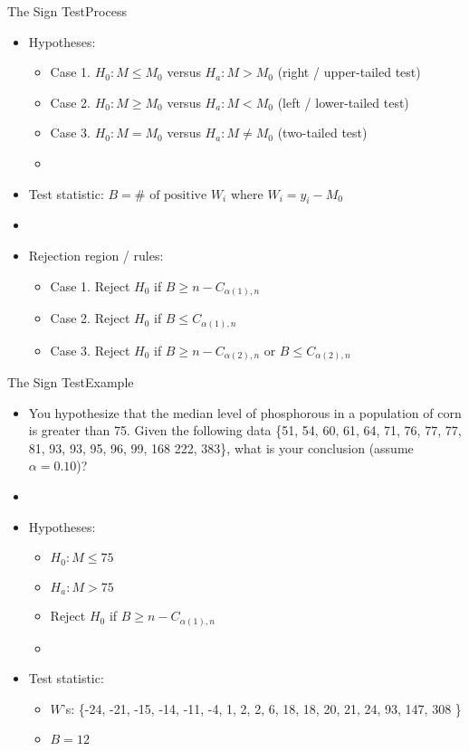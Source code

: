 \documentclass[xcolor=dvipsnames]{beamer}
\begin{document}
\begin{frame}{The Sign Test}{Process}
\begin{itemize}
\item Hypotheses:
\begin{itemize}
	\item Case 1. $H_0: M \leq M_0$ versus $H_a: M > M_0$ (right / upper-tailed test) \pause
	\item Case 2. $H_0: M \geq M_0$ versus $H_a: M < M_0$ (left / lower-tailed test) \pause
	\item Case 3. $H_0: M = M_0$ versus $H_a: M \neq M_0$ (two-tailed test) \pause
	\item[]
\end{itemize}
\item Test statistic: $B = \# \text{ of positive } W_i$ where $W_i = y_i - M_0$ \pause
\item[]
\item Rejection region / rules: \pause
\begin{itemize}
	\item Case 1. Reject $H_0$ if $B \geq n - C_{\alpha(1), n}$ \pause
	\item Case 2. Reject $H_0$ if $B \leq C_{\alpha(1), n}$ \pause
	\item Case 3. Reject $H_0$ if $B \geq n - C_{\alpha(2), n}$ or $B \leq C_{\alpha(2), n}$
\end{itemize}
\end{itemize}
\end{frame}

\begin{frame}{The Sign Test}{Example}
	\begin{itemize}
		\item You hypothesize that the median level of phosphorous in a population of corn is greater than 75. Given the following data \{51, 54, 60, 61, 64, 71, 76, 77, 77, 81, 93, 93, 95, 96, 99, 168 222, 383\}, what is your conclusion (assume $\alpha = 0.10$)? \pause
		\item[]
		\item Hypotheses: \pause
		\begin{itemize}
			\item $H_0: M \leq 75$ \pause
			\item $H_a: M > 75$ \pause
			\item Reject $H_0$ if $B \geq n - C_{\alpha(1), n}$ \pause
			\item[]
		\end{itemize}
	\item Test statistic: \pause
	\begin{itemize}
		\item $W$'s: \{-24, -21, -15, -14, -11,  -4, 1, 2, 2, 6, 18, 18, 20, 21, 24, 93, 147, 308 \} \pause
		\item $B = 12$
	\end{itemize}
	\end{itemize}
\end{frame}
\end{document}
